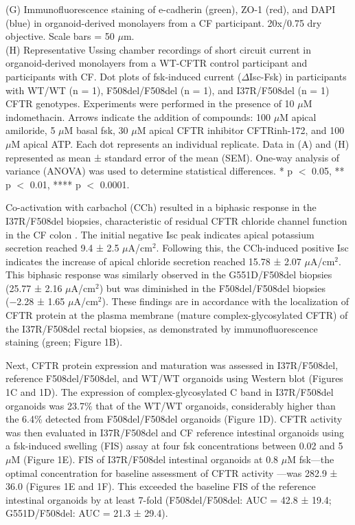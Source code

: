 {(G) Immunofluorescence staining of e-cadherin (green), ZO-1 (red), and DAPI (blue) in organoid-derived monolayers from a CF participant. 20x/0.75 dry objective. Scale bars = 50 $\mu$m.\\

(H) Representative Ussing chamber recordings of short circuit current in organoid-derived monolayers from a WT-CFTR control participant and participants with CF. Dot plots of fsk-induced current ($\Delta$Isc-Fsk) in participants with WT/WT (n = 1), F508del/F508del (n = 1), and I37R/F508del (n = 1) CFTR genotypes. Experiments were performed in the presence of 10 $\mu$M indomethacin. Arrows indicate the addition of compounds: 100 $\mu$M apical amiloride, 5 $\mu$M basal fsk, 30 $\mu$M apical CFTR inhibitor CFTRinh-172, and 100 $\mu$M apical ATP. Each dot represents an individual replicate. Data in (A) and (H) represented as mean ± standard error of the mean (SEM). One-way analysis of variance (ANOVA) was used to determine statistical differences. * p $<$ 0.05, ** p $<$ 0.01, **** p $<$ 0.0001.\\
}
\endgroup

\smallskip

Co-activation with carbachol (CCh) resulted in a biphasic response in the I37R/F508del biopsies, characteristic of residual CFTR chloride channel function in the CF colon \cite{graeber2015,veeze1994}. The initial negative Isc peak indicates apical potassium secretion reached 9.4 ± 2.5 $\mu$A/cm$^2$. Following this, the CCh-induced positive Isc indicates the increase of apical chloride secretion reached 15.78 ± 2.07 $\mu$A/cm$^2$. This biphasic response was similarly observed in the G551D/F508del biopsies (25.77 ± 2.16 $\mu$A/cm$^2$) but was diminished in the F508del/F508del biopsies (−2.28 ± 1.65 $\mu$A/cm$^2$). These findings are in accordance with the localization of CFTR protein at the plasma membrane (mature complex-glycosylated CFTR) of the I37R/F508del rectal biopsies, as demonstrated by immunofluorescence staining (green; Figure 1B).

Next, CFTR protein expression and maturation was assessed in I37R/F508del, reference F508del/F508del, and WT/WT organoids using Western blot (Figures 1C and 1D). The expression of complex-glycosylated C band in I37R/F508del organoids was 23.7\% that of the WT/WT organoids, considerably higher than the 6.4\% detected from F508del/F508del organoids (Figure 1D). CFTR activity was then evaluated in I37R/F508del and CF reference intestinal organoids using a fsk-induced swelling (FIS) assay at four fsk concentrations between 0.02 and 5 $\mu$M (Figure 1E). FIS of I37R/F508del intestinal organoids at 0.8 $\mu$M fsk—the optimal concentration for baseline assessment of CFTR activity \cite{dekkers2016}—was 282.9 ± 36.0 (Figures 1E and 1F). This exceeded the baseline FIS of the reference intestinal organoids by at least 7-fold (F508del/F508del: AUC = 42.8 ± 19.4; G551D/F508del: AUC = 21.3 ± 29.4).

